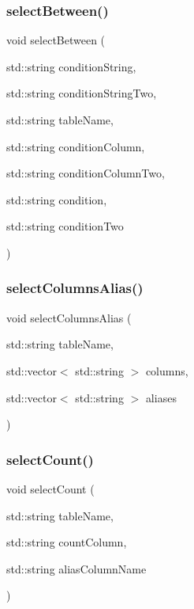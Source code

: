 \mbox{\label{sqllib_8hpp_aaa15591ca7a3ba5d40fa77b7ae6753db}} 
\subsubsection{select\+Between()}
{\footnotesize\ttfamily void select\+Between (\begin{DoxyParamCaption}\item[{std\+::string}]{condition\+String,  }\item[{std\+::string}]{condition\+String\+Two,  }\item[{std\+::string}]{table\+Name,  }\item[{std\+::string}]{condition\+Column,  }\item[{std\+::string}]{condition\+Column\+Two,  }\item[{std\+::string}]{condition,  }\item[{std\+::string}]{condition\+Two }\end{DoxyParamCaption})}

\mbox{\label{sqllib_8hpp_a0bd3f475ec96949ae94bbbbec41f7725}} 
\subsubsection{select\+Columns\+Alias()}
{\footnotesize\ttfamily void select\+Columns\+Alias (\begin{DoxyParamCaption}\item[{std\+::string}]{table\+Name,  }\item[{std\+::vector$<$ std\+::string $>$}]{columns,  }\item[{std\+::vector$<$ std\+::string $>$}]{aliases }\end{DoxyParamCaption})}

\mbox{\label{sqllib_8hpp_a00f071477f164f70927ee9923dd77a39}} 
\subsubsection{select\+Count()}
{\footnotesize\ttfamily void select\+Count (\begin{DoxyParamCaption}\item[{std\+::string}]{table\+Name,  }\item[{std\+::string}]{count\+Column,  }\item[{std\+::string}]{alias\+Column\+Name }\end{DoxyParamCaption})}


